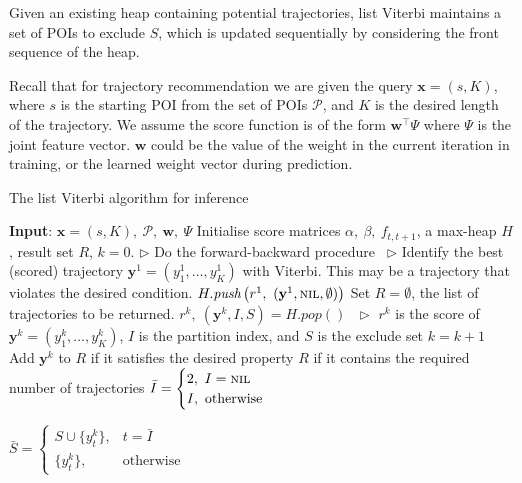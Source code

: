 Given an existing heap containing potential trajectories,
list Viterbi maintains a set of POIs to exclude $S$, which is updated
sequentially by considering the front sequence of the heap.

Recall that for trajectory recommendation we are given the query $\mathbf{x}=(s, K)$, where
$s$ is the starting POI from the set of POIs $\mathcal{P}$,
and $K$ is the desired length of the trajectory.
We assume the score function is of the form $\mathbf{w}^\top \Psi$ where $\Psi$ is the joint
feature vector. $\mathbf{w}$ could be the value of the weight in the current iteration in training,
or the learned weight vector during prediction.

\begin{algorithm}[htbp]
\caption{The list Viterbi algorithm for inference~\cite{nilsson2001sequentially,seshadri1994list}}
\label{alg:listviterbi}
\begin{algorithmic}[1]
\STATE \textbf{Input}: $\mathbf{x}=(s, K),~ \mathcal{P},~ \mathbf{w},~ \Psi$
\STATE Initialise score matrices $\alpha,~ \beta,~ f_{t, t+1}$, a max-heap $H$, result set $R$, $k=0$.
\STATE $\triangleright$ Do the forward-backward procedure~\cite{rabiner1989tutorial}
\STATE $\triangleright$ Identify the best (scored) trajectory $\mathbf{y}^1=(y_1^1,\dots,y_K^1)$
  with Viterbi. This may be a trajectory that violates the desired condition.
\STATE $H.\textit{push}\left(r^1,~ (\mathbf{y}^1, \textsc{nil}, \emptyset) \right)$
\STATE Set $R=\emptyset$, the list of trajectories to be returned.
    \STATE $r^k,~ (\mathbf{y}^k, I, S) = H.\textit{pop}()~~~ \triangleright$
           $r^k$ is the score of $\mathbf{y}^k=(y_1^k,\dots,y_K^k)$, $I$ is the partition index, and $S$ is the exclude set
    \STATE $k = k + 1$
    \STATE Add $\mathbf{y}^k$ to $R$ if it satisfies the desired property
    \RETURN $R$ if it contains the required number of trajectories
    \STATE $\bar{I} = \begin{cases}
                      2,~ I = \textsc{nil} \\
                      I,~ \text{otherwise}
                      \end{cases}$

        \STATE $\bar{S} = \begin{cases}
                          S \cup \{ y_t^k \},& t = \bar{I} \\
                          \{ y_t^k \},& \text{otherwise}
                          \end{cases}$


\end{algorithmic}
\end{algorithm}

